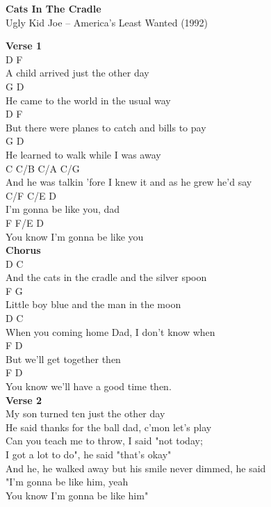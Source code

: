 \documentclass[a4paper]{article}
\begin{document}
    \begin{center}
        \textbf{Cats In The Cradle}
        ~\\
        Ugly Kid Joe -- America's Least Wanted (1992)
    \end{center}
    {
        \scriptsize
        \textbf{Verse 1}
        ~\\
        {
            \cutive
            \obeyspaces
  D                      F
\\
A child arrived just the other day
\\
   G                        D
\\
He came to the world in the usual way
\\
               D                   F
\\
But there were planes to catch and bills to pay
\\
G                            D
\\
  He learned to walk while I was away
\\
           C              C/B        C/A       C/G
\\
And he was talkin 'fore I knew it and as he grew he'd say
\\
C/F       C/E    D
\\
I'm gonna be like you, dad
\\
    F              F/E    D
\\
You know I'm gonna be like you
\\

        }
        \textbf{Chorus}
        ~\\
        {
            \cutive
            \obeyspaces
        D                          C
\\
And the cats in the cradle and the silver spoon
\\
F                        G
\\
Little boy blue and the man in the moon
\\
D                           C
\\
When you coming home Dad, I don't know when
\\
F                        D
\\
But we'll get together then
\\
F                       D
\\
You know we'll have a good time then.
\\

        }
        \textbf{Verse 2}
        ~\\
        {
            \cutive
            \obeyspaces
My son turned ten just the other day
\\
He said thanks for the ball dad, c'mon let's play
\\
Can you teach me to throw, I said "not today;  
\\
I got a lot to do", he said "that's okay"
\\
And he, he walked away but his smile never dimmed, he said
\\
"I'm gonna be like him, yeah
\\
You know I'm gonna be like him"
\\

}}
\end{document}
